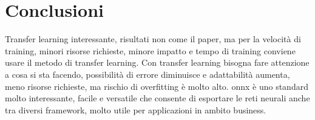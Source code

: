 \section{Conclusioni}


Transfer learning interessante, risultati non come il paper, ma per la velocità di training, minori risorse richieste, minore impatto e tempo di training conviene usare il metodo di transfer learning.
Con transfer learning bisogna fare attenzione a cosa si sta facendo, possibilità di errore diminuisce e adattabilità aumenta, meno risorse richieste, ma rischio di overfitting è molto alto.
onnx è uno standard molto interessante, facile e versatile che consente di esportare le reti neurali anche tra diversi framework, molto utile per applicazioni in ambito business.






